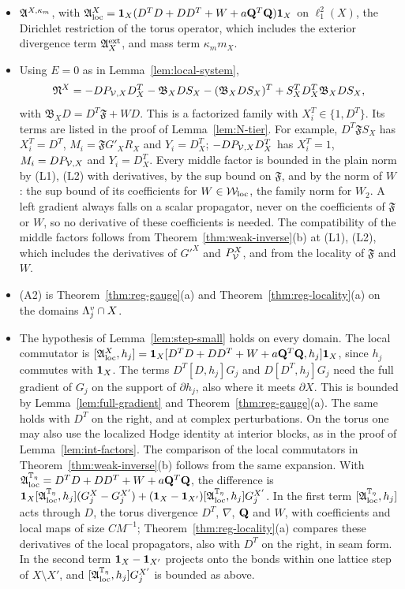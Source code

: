 \begin{enumerate}[label=(L\arabic*)]
  \begin{itemize}
  \item $\mathfrak A^{X,\kappa_m}$, with $\mathfrak A^X_{\rm loc}=\mathbf 1_X(D^TD+DD^T+W+a\mathbf Q^T\mathbf Q)\mathbf 1_X$ on $\ell^2_1(X)$, the Dirichlet restriction of the torus operator, which includes the exterior divergence term $\mathfrak A^{\rm ext}_X$, and mass term $\kappa_mm_X$.
  \item Using $E=0$ as in Lemma~\ref{lem:local-system},
  \[
  \mathfrak N^X=-DP_{\mathcal V,X}D^T_X-\mathfrak B_XDS_X-(\mathfrak B_XDS_X)^T+S_X^TD^T_X\mathfrak B_XDS_X ,
  \]
  with $\mathfrak B_XD=D^T\mathfrak F+WD$.
  This is a factorized family with $X_i^T\in\{1,D^T\}$. Its terms are listed in the proof of Lemma~\ref{lem:N-tier}. For example, $D^T\mathfrak FS_X$ has $X_i^T=D^T$, $M_i=\mathfrak FG'_XR_X$ and $Y_i=D^T_X$; $-DP_{\mathcal V,X}D^T_X$ has $X_i^T=1$, $M_i=DP_{\mathcal V,X}$ and $Y_i=D^T_X$. Every middle factor is bounded in the plain norm by (L1), (L2) with derivatives, by the sup bound on $\mathfrak F$, and by the norm of $W$: the sup bound of its coefficients for $W\in\mathcal W_{\rm loc}$, the family norm for $W_2$. A left gradient always falls on a scalar propagator, never on the coefficients of $\mathfrak F$ or $W$, so no derivative of these coefficients is needed. The compatibility of the middle factors follows from Theorem~\ref{thm:weak-inverse}(b) at (L1), (L2), which includes the derivatives of $G'^X$ and $P^X_\mathcal V$, and from the locality of $\mathfrak F$ and $W$.
  \item (A2) is Theorem~\ref{thm:reg-gauge}(a) and Theorem~\ref{thm:reg-locality}(a) on the domains $\Lambda^v_j\cap X$.
  \item The hypothesis of Lemma~\ref{lem:step-small} holds on every domain. The local commutator is $[\mathfrak A^X_{\rm loc},h_j]=\mathbf 1_X[D^TD+DD^T+W+a\mathbf Q^T\mathbf Q,h_j]\mathbf 1_X$, since $h_j$ commutes with $\mathbf 1_X$. The terms $D^T[D,h_j]G_j$ and $D[D^T,h_j]G_j$ need the full gradient of $G_j$ on the support of $\partial h_j$, also where it meets $\partial X$. This is bounded by Lemma~\ref{lem:full-gradient} and Theorem~\ref{thm:reg-gauge}(a). The same holds with $D^T$ on the right, and at complex perturbations. On the torus one may also use the localized Hodge identity at interior blocks, as in the proof of Lemma~\ref{lem:int-factors}. The comparison of the local commutators in Theorem~\ref{thm:weak-inverse}(b) follows from the same expansion. With $\mathfrak A^{\mathbb T_\eta}_{\rm loc}=D^TD+DD^T+W+a\mathbf Q^T\mathbf Q$, the difference is $\mathbf 1_X[\mathfrak A^{\mathbb T_\eta}_{\rm loc},h_j](G^X_j-G^{X'}_j)+(\mathbf 1_X-\mathbf 1_{X'})[\mathfrak A^{\mathbb T_\eta}_{\rm loc},h_j]G^{X'}_j$. In the first term $[\mathfrak A^{\mathbb T_\eta}_{\rm loc},h_j]$ acts through $D$, the torus divergence $D^T$, $\nabla$, $\mathbf Q$ and $W$, with coefficients and local maps of size $CM^{-1}$; Theorem~\ref{thm:reg-locality}(a) compares these derivatives of the local propagators, also with $D^T$ on the right, in seam form. In the second term $\mathbf 1_X-\mathbf 1_{X'}$ projects onto the bonds within one lattice step of $X\setminus X'$, and $[\mathfrak A^{\mathbb T_\eta}_{\rm loc},h_j]G^{X'}_j$ is bounded as above.

\end{itemize}
\end{enumerate}
